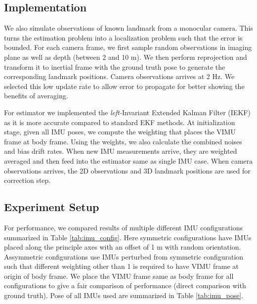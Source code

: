 \documentclass[conference]{IEEEtran}
\begin{document}
\subsection{Implementation}

We also simulate observations of known landmark from a monocular camera. This turns the estimation problem into a localization problem such that the error is bounded. For each camera frame, we first sample random observations in imaging plane as well as depth (between 2 and 10 m). We then perform reprojection and transform it to inertial frame with the ground truth pose to generate the corresponding landmark positions. Camera observations arrives at 2 Hz. We selected this low update rate to allow error to propagate for better showing the benefits of averaging.

For estimator we implemented the \textit{left-}Invariant Extended Kalman Filter (IEKF) \cite{IEKF} as it is more accurate compared to standard EKF methods. At initialization stage, given all IMU poses, we compute the weighting that places the VIMU frame at body frame. Using the weights, we also calculate the combined noises and bias drift rates. When new IMU measurements arrive, they are weighted averaged and then feed into the estimator same as single IMU case. When camera observations arrives, the 2D observations and 3D landmark positions are used for correction step.

\subsection{Experiment Setup}

For performance, we compared results of multiple different IMU configurations summarized in Table \ref{tab:imu_config}. Here symmetric configurations have IMUs placed along the principle axes with an offset of 1 m with random orientation. Assymmetric configurations use IMUs perturbed from symmetric configuration such that different weighting other than 1 is required to have VIMU frame at origin of body frame. We place the VIMU frame same as body frame for all configurations to give a fair comparison of performance (direct comparison with ground truth). Pose of all IMUs used are summarized in Table \ref{tab:imu_pose}.
\end{document}
